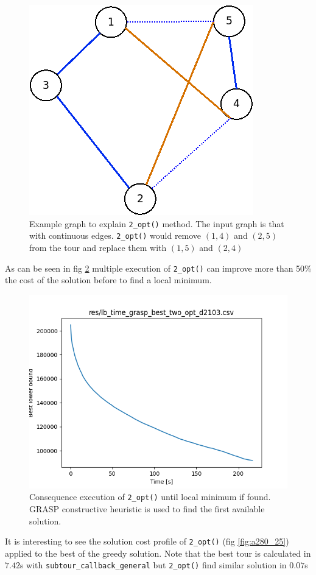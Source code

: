 \begin{figure}[h]
	\centering
	\includegraphics[width=.3\columnwidth]{img/2_opt_graph.png}
	\caption{Example graph to explain \texttt{2\_opt()} method. The input graph is that with continuous edges. \texttt{2\_opt()} would remove $ (1,4) $ and $ (2,5) $ from the tour and replace them with $ (1,5) $ and $  (2,4) $}
	\label{fig:2_opt_graph}
\end{figure}
As can be seen in fig \ref{fig:lb_time_grasp_best_two_opt_d2103} multiple execution of \texttt{2\_opt()} can improve more than 50\% the cost of the solution before to find a local minimum.
\begin{figure}[!h]
\centering
\includegraphics[width=.6\columnwidth]{../res/lb_time_grasp_best_two_opt_d2103.png}
\caption{Consequence execution of \texttt{2\_opt()} until local minimum if found. GRASP constructive heuristic is used to find the first available solution.}
\label{fig:lb_time_grasp_best_two_opt_d2103}
\end{figure}

It is interesting to see the solution cost profile of \texttt{2\_opt()} (fig \ref{fig:a280_25}) applied to the best of the greedy solution. Note that the best tour is calculated in $ 7.42 $s with \texttt{subtour\_callback\_general} but \texttt{2\_opt()} find similar solution in $ 0.07$s

